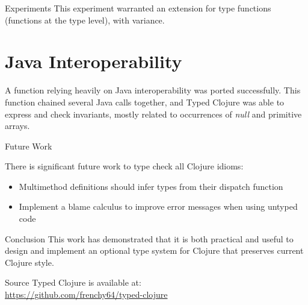 \documentclass[landscape,final,a0paper,fontscale=0.25]{baposter}
\begin{document}
\begin{poster}
\begin{posterbox}[name=experiments,column=2]{Experiments}
This experiment warranted an extension for type functions (functions at the type level), with variance.

\section*{Java Interoperability}

A function relying heavily on Java interoperability was ported successfully.
This function chained several Java calls together, and
Typed Clojure was able to express and check invariants, mostly related to occurrences of \emph{null}
and primitive arrays.

\end{posterbox}

\begin{posterbox}[name=futurework,column=2,below=experiments]{Future Work}

There is significant future work to type check all Clojure idioms:

\begin{itemize}
\item Multimethod definitions should infer types from their dispatch function
\item Implement a blame calculus to improve error messages when using untyped code
\end{itemize}

\end{posterbox}

\begin{posterbox}[name=conclusion,column=2,below=futurework]{Conclusion}
This work has demonstrated that it is both practical and useful to
design and implement an optional type system for Clojure that preserves
current Clojure style.
\end{posterbox}

\begin{posterbox}[name=source,column=2,above=bottom]{Source}
Typed Clojure is available at: \\
\url{https://github.com/frenchy64/typed-clojure}
\end{posterbox}

\end{poster}
\end{document}
